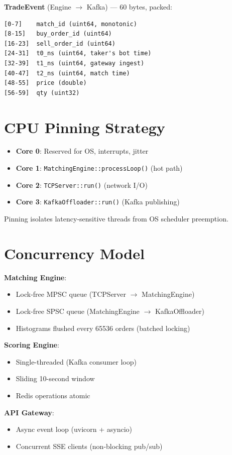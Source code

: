 \documentclass[10pt,a4paper,oneside]{report}
\begin{document}
\textbf{TradeEvent} (Engine $\rightarrow$ Kafka) — 60 bytes, packed:
\begin{lstlisting}
[0-7]    match_id (uint64, monotonic)
[8-15]   buy_order_id (uint64)
[16-23]  sell_order_id (uint64)
[24-31]  t0_ns (uint64, taker's bot time)
[32-39]  t1_ns (uint64, gateway ingest)
[40-47]  t2_ns (uint64, match time)
[48-55]  price (double)
[56-59]  qty (uint32)
\end{lstlisting}

\section{CPU Pinning Strategy}

\begin{itemize}
    \item \textbf{Core 0}: Reserved for OS, interrupts, jitter
    \item \textbf{Core 1}: \texttt{MatchingEngine::processLoop()} (hot path)
    \item \textbf{Core 2}: \texttt{TCPServer::run()} (network I/O)
    \item \textbf{Core 3}: \texttt{KafkaOffloader::run()} (Kafka publishing)
\end{itemize}

Pinning isolates latency-sensitive threads from OS scheduler preemption.

\section{Concurrency Model}

\textbf{Matching Engine}:
\begin{itemize}
    \item Lock-free MPSC queue (TCPServer $\rightarrow$ MatchingEngine)
    \item Lock-free SPSC queue (MatchingEngine $\rightarrow$ KafkaOffloader)
    \item Histograms flushed every 65536 orders (batched locking)
\end{itemize}

\textbf{Scoring Engine}:
\begin{itemize}
    \item Single-threaded (Kafka consumer loop)
    \item Sliding 10-second window
    \item Redis operations atomic
\end{itemize}

\textbf{API Gateway}:
\begin{itemize}
    \item Async event loop (uvicorn + asyncio)
    \item Concurrent SSE clients (non-blocking pub/sub)
\end{itemize}
\end{document}
